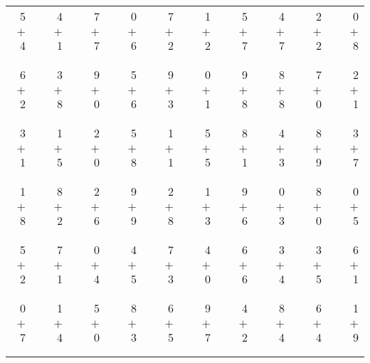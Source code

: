 \documentclass[12pt, letterpaper]{article}
\begin{document}
\begin{tabular}{rrrrrrrrrrrrrrrrrrr}
5 & & 4 & & 7 & & 0 & & 7 & & 1 & & 5 & & 4 & & 2 & & 0\\
$+$ 4 & & $+$ 1 & & $+$ 7 & & $+$ 6 & & $+$ 2 & & $+$ 2 & & $+$ 7 & & $+$ 7 & & $+$ 2 & & $+$ 8\\
\cline{1-1} \cline{3-3} \cline{5-5} \cline{7-7} \cline{9-9} \cline{11-11} \cline{13-13} \cline{15-15} \cline{17-17} \cline{19-19} \\ \\
6 & & 3 & & 9 & & 5 & & 9 & & 0 & & 9 & & 8 & & 7 & & 2\\
$+$ 2 & & $+$ 8 & & $+$ 0 & & $+$ 6 & & $+$ 3 & & $+$ 1 & & $+$ 8 & & $+$ 8 & & $+$ 0 & & $+$ 1\\
\cline{1-1} \cline{3-3} \cline{5-5} \cline{7-7} \cline{9-9} \cline{11-11} \cline{13-13} \cline{15-15} \cline{17-17} \cline{19-19} \\ \\
3 & & 1 & & 2 & & 5 & & 1 & & 5 & & 8 & & 4 & & 8 & & 3\\
$+$ 1 & & $+$ 5 & & $+$ 0 & & $+$ 8 & & $+$ 1 & & $+$ 5 & & $+$ 1 & & $+$ 3 & & $+$ 9 & & $+$ 7\\
\cline{1-1} \cline{3-3} \cline{5-5} \cline{7-7} \cline{9-9} \cline{11-11} \cline{13-13} \cline{15-15} \cline{17-17} \cline{19-19} \\ \\
1 & & 8 & & 2 & & 9 & & 2 & & 1 & & 9 & & 0 & & 8 & & 0\\
$+$ 8 & & $+$ 2 & & $+$ 6 & & $+$ 9 & & $+$ 8 & & $+$ 3 & & $+$ 6 & & $+$ 3 & & $+$ 0 & & $+$ 5\\
\cline{1-1} \cline{3-3} \cline{5-5} \cline{7-7} \cline{9-9} \cline{11-11} \cline{13-13} \cline{15-15} \cline{17-17} \cline{19-19} \\ \\
5 & & 7 & & 0 & & 4 & & 7 & & 4 & & 6 & & 3 & & 3 & & 6\\
$+$ 2 & & $+$ 1 & & $+$ 4 & & $+$ 5 & & $+$ 3 & & $+$ 0 & & $+$ 6 & & $+$ 4 & & $+$ 5 & & $+$ 1\\
\cline{1-1} \cline{3-3} \cline{5-5} \cline{7-7} \cline{9-9} \cline{11-11} \cline{13-13} \cline{15-15} \cline{17-17} \cline{19-19} \\ \\
0 & & 1 & & 5 & & 8 & & 6 & & 9 & & 4 & & 8 & & 6 & & 1\\
$+$ 7 & & $+$ 4 & & $+$ 0 & & $+$ 3 & & $+$ 5 & & $+$ 7 & & $+$ 2 & & $+$ 4 & & $+$ 4 & & $+$ 9\\
\cline{1-1} \cline{3-3} \cline{5-5} \cline{7-7} \cline{9-9} \cline{11-11} \cline{13-13} \cline{15-15} \cline{17-17} \cline{19-19} \\ \\

\end{tabular}
\end{document}
